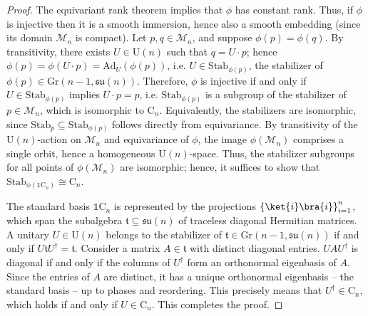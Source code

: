 \documentclass[referee,sn-mathphys-num]{sn-jnl}%
\theoremstyle{thmstyleone}%
\theoremstyle{thmstyletwo}%
\theoremstyle{remark}
\theoremstyle{thmstylethree}%
\begin{document}
\begin{proof}
	The equivariant rank theorem implies that $\phi$ has constant rank. Thus, if $\phi$ is injective then it is a smooth immersion, hence also a smooth embedding (since its domain $\mathcal{M}_n$ is compact). Let $p,q \in \mathcal{M}_n$, and suppose $ \phi \left( p \right) = \phi \left( q \right) $. By transitivity, there exists $ U \in \mathrm{U} \left( n \right) $ such that $ q = U \cdot p $; hence $  \phi \left( p \right) =  \phi \left( U \cdot p \right) = \mathrm{Ad}_U \left( \phi \left( p \right) \right) $, i.e. $ U \in \mathrm{Stab}_{\phi \left( p \right)} $, the stabilizer of $\phi \left( p \right) \in \mathrm{Gr} \left(  n-1, \mathfrak{su} \left( n \right) \right)$. Therefore, $\phi$ is injective if and only if $ U \in \mathrm{Stab}_{\phi \left( p \right)} $ implies $ U \cdot p = p $, i.e. $ \mathrm{Stab}_{\phi \left( p \right)} $ is a subgroup of the stabilizer of $p \in \mathcal{M}_n$, which is isomorphic to $\mathrm{C}_n$. Equivalently, the stabilizers are isomorphic, since $ \mathrm{Stab}_p \subseteq \mathrm{Stab}_{\phi \left( p \right)} $ follows directly from equivariance.
	By transitivity of the $ \mathrm{U} \left( n \right) $-action on $ \mathcal{M}_n $ and equivariance of $\phi$, the image $ \phi \left( \mathcal{M}_n \right) $ comprises a single orbit, hence a homogeneous $ \mathrm{U} \left( n \right) $-space. Thus, the stabilizer subgroups for all points of $\phi \left( \mathcal{M}_n \right)$ are isomorphic; hence, it suffices to show that $ \mathrm{Stab}_{\phi \left( \mathds{1} \mathrm{C}_n \right)} \cong \mathrm{C}_n $.
	
	The standard basis $ \mathds{1} \mathrm{C}_n $ is represented by the projections $\left\{ \ket{i} \bra{i} \right\}_{i=1}^n $, which span the subalgebra $ \mathfrak{t} \subseteq \mathfrak{su} \left( n \right) $ of traceless diagonal Hermitian matrices. A unitary $ U \in \mathrm{U} \left( n \right) $ belongs to the stabilizer of $ \mathfrak{t} \in \mathrm{Gr} \left(  n-1, \mathfrak{su} \left( n \right) \right) $ if and only if $ U \mathfrak{t} U^\dagger = \mathfrak{t} $. Consider a matrix $A \in \mathfrak{t}$ with distinct diagonal entries. $ U A U^\dagger $ is diagonal if and only if the columns of $U^\dagger$ form an orthonormal eigenbasis of $A$. Since the entries of $A$ are distinct, it has a unique orthonormal eigenbasis -- the standard basis -- up to phases and reordering. This precisely means that $ U^\dagger \in \mathrm{C}_n $, which holds if and only if $ U \in \mathrm{C}_n $. This completes the proof.
\end{proof}
\end{document}

